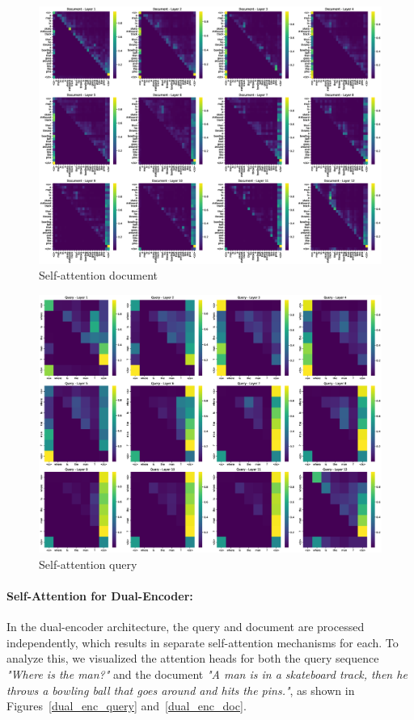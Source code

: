 \documentclass[runningheads]{llncs}
\begin{document}
\begin{figure}
  \centering
  \includegraphics[width=\textwidth, clip=true]{attention_layers_document.eps}
  \caption{Self-attention document} \label{self_att_document}
  \label{img:self_attention_document}
\end{figure}


\begin{figure}
  \centering
  \includegraphics[width=\textwidth, clip=true]{attention_layers_query.eps}
  \caption{Self-attention query} \label{self_att_query}
  \label{img:self_attention_query}
\end{figure}

\paragraph{Self-Attention for Dual-Encoder:} 
In the dual-encoder architecture, the query and document are processed independently, which results in separate self-attention mechanisms for each. To analyze this, we visualized the attention heads for both the query sequence \textit{"Where is the man?"} and the document \textit{"A man is in a skateboard track, then he throws a bowling ball that goes around and hits the pins."}, as shown in Figures~\ref{dual_enc_query} and~\ref{dual_enc_doc}.
\end{document}
